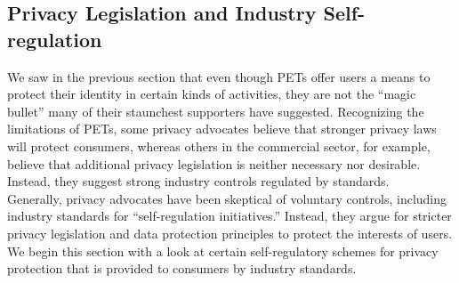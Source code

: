 \documentclass[12pt]{article}
\theoremstyle{definition}
\begin{document}
\subsection{Privacy Legislation and Industry Self-regulation}
We saw in the previous section that even though PETs offer users a means to protect their
identity in certain kinds of activities, they are not the “magic bullet” many of their
staunchest supporters have suggested. Recognizing the limitations of PETs, some privacy
advocates believe that stronger privacy laws will protect consumers, whereas others in the
commercial sector, for example, believe that additional privacy legislation is neither
necessary nor desirable. Instead, they suggest strong industry controls regulated by
standards.\\
Generally, privacy advocates have been skeptical of voluntary controls, including
industry standards for “self-regulation initiatives.” Instead, they argue for stricter privacy
legislation and data protection principles to protect the interests of users. We begin this
section with a look at certain self-regulatory schemes for privacy protection that is
provided to consumers by industry standards.
\end{document}
